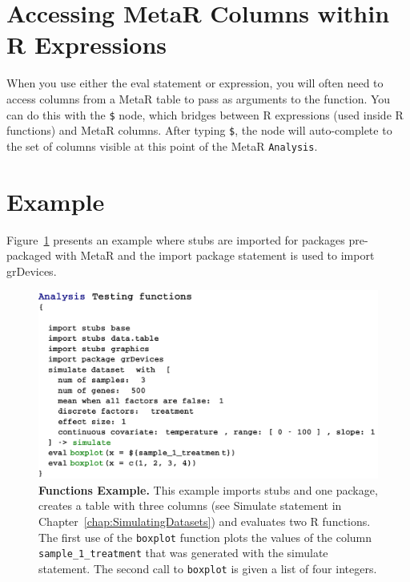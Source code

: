 \section{Accessing MetaR Columns within R Expressions}\label{sec:AccessingMetaRColumns}
When you use either the eval statement or expression, you will often need to access columns from a MetaR table to pass as arguments to the function. You can do this with the \texttt{\$} node, which bridges between R expressions (used inside R functions) and MetaR columns. After typing \texttt{\$}, the node will auto-complete to the set of columns visible at this point of the MetaR \texttt{Analysis}. 


\section{Example}
Figure~\ref{fig:TestinFunctionsExample} presents an example where stubs are imported for packages pre-packaged with MetaR and the import package statement is used to import grDevices.
\begin{figure}[h!tbp]
  \centering
  \includegraphics[width=\figWidthWide]{figures/TestinFunctionsExample.pdf}
\caption[Functions Example.]{\textbf{Functions Example.} This example imports stubs and one package, creates a table with three columns (see Simulate statement in Chapter~\ref{chap:SimulatingDatasets}) and evaluates two R functions. The first use of the \texttt{boxplot} function plots the values of the column \texttt{sample\_1\_treatment} that was generated with the simulate statement. The second call to \texttt{boxplot} is given a list of four integers.}
\label{fig:TestinFunctionsExample}
\end{figure}

